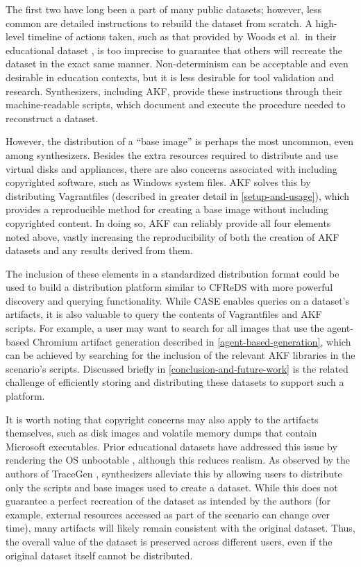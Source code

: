 \documentclass[preprint,12pt]{elsarticle}
\begin{document}
The first two have long been a part of many public datasets; however,
less common are detailed instructions to rebuild the dataset from
scratch. A high-level timeline of actions taken, such as that provided
by Woods et al.~in their educational dataset
\citep{woodsCreatingRealisticCorpora2011}, is too imprecise to
guarantee that others will recreate the dataset in the exact same
manner. Non-determinism can be acceptable and even desirable in
education contexts, but it is less desirable for tool validation and
research. Synthesizers, including AKF, provide these instructions
through their machine-readable scripts, which document and execute the
procedure needed to reconstruct a dataset.

However, the distribution of a ``base image'' is perhaps the most
uncommon, even among synthesizers. Besides the extra resources required
to distribute and use virtual disks and appliances, there are also
concerns associated with including copyrighted software, such as Windows
system files. AKF solves this by distributing Vagrantfiles (described in
greater detail in \autoref{setup-and-usage}), which provides a
reproducible method for creating a base image without including
copyrighted content. In doing so, AKF can reliably provide all four
elements noted above, vastly increasing the reproducibility of both the
creation of AKF datasets and any results derived from them.

The inclusion of these elements in a standardized distribution format
could be used to build a distribution platform similar to CFReDS with
more powerful discovery and querying functionality. While CASE enables
queries on a dataset's artifacts, it is also valuable to query the
contents of Vagrantfiles and AKF scripts. For example, a user may want
to search for all images that use the agent-based Chromium artifact
generation described in \autoref{agent-based-generation}, which can be
achieved by searching for the inclusion of the relevant AKF libraries in
the scenario's scripts. Discussed briefly in \autoref{conclusion-and-future-work} is the related challenge of efficiently storing and
distributing these datasets to support such a platform.

It is worth noting that copyright concerns may also apply to the
artifacts themselves, such as disk images and volatile memory dumps that
contain Microsoft executables. Prior educational datasets have addressed
this issue by rendering the OS unbootable
\citep{woodsCreatingRealisticCorpora2011,garfinkelBringingScienceDigital2009},
although this reduces realism. As observed by the authors of TraceGen
\citep{duTraceGenUserActivity2021}, synthesizers alleviate this by
allowing users to distribute only the scripts and base images used to
create a dataset. While this does not guarantee a perfect recreation of
the dataset as intended by the authors (for example, external resources
accessed as part of the scenario can change over time), many artifacts
will likely remain consistent with the original dataset. Thus, the
overall value of the dataset is preserved across different users, even
if the original dataset itself cannot be distributed.
\end{document}

